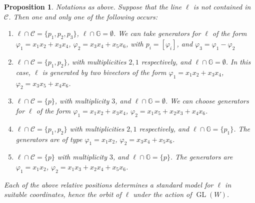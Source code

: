\documentclass[10pt,reqno]{amsart}
\newcommand{\cC}{{\mathcal{C}}}
\newcommand{\GG}{\mathbb{G}}
\newcommand{\GL}{\operatorname{GL}}
\newcommand{\f}{\varphi}
\newtheorem{proposition}[theorem]{Proposition}
\theoremstyle{definition}
\begin{document}
\begin{proposition} \label{prop:case62-rel-positions-l-not-contained-C}
Notations as above. Suppose that the line $\ell$ is not contained in $\cC$. Then one and only one of the following occurs:
\begin{enumerate}
\item $\ell \cap \cC=\{p_1,p_2,p_3\}$, $\ell \cap \GG=\emptyset$. 
We can take generators for $\ell$ of the form $\f_1=x_1x_2+x_3x_4$, $\f_2=x_3x_4+x_5x_6$, with $p_i=[\f_i]$, and $\f_3=\f_1-\f_2$

\medskip

\item $\ell \cap \cC=\{p_1,p_2\}$, with multiplicities $2,1$ respectively, and $\ell \cap \GG=\emptyset$. 
In this case, $\ell$ is generated by two bivectors of the form $\f_1=x_1x_2+x_3x_4$, $\f_2=x_3x_5+x_4x_6$.

\medskip

\item $\ell \cap \cC=\{p\}$, with multiplicity $3$, and $\ell \cap \GG=\emptyset$. 
We can choose generators for $\ell$ of the form $\f_1=x_1x_2+x_3x_4$, $\f_2=x_1x_5+x_2x_3+x_4x_6$.

\medskip

\item $\ell \cap \cC=\{p_1,p_2\}$ with multiplicities $2,1$ respectively, and $\ell \cap \GG=\{p_1\}$. The generators are of type $\f_1=x_1x_2$, $\f_2=x_3x_4+x_5x_6$.

\medskip

\item $\ell \cap \cC=\{p\}$ with multiplicity $3$, and $\ell \cap \GG=\{p\}$. The generators are $\f_1=x_1x_2$, $\f_2=x_1x_3+x_2x_4+x_5x_6$.
\end{enumerate}
Each of the above relative positions determines a standard model for $\ell$ in suitable coordinates, hence the orbit of $\ell$ under the action of $\GL(W)$. 
\end{proposition}
\end{document}

